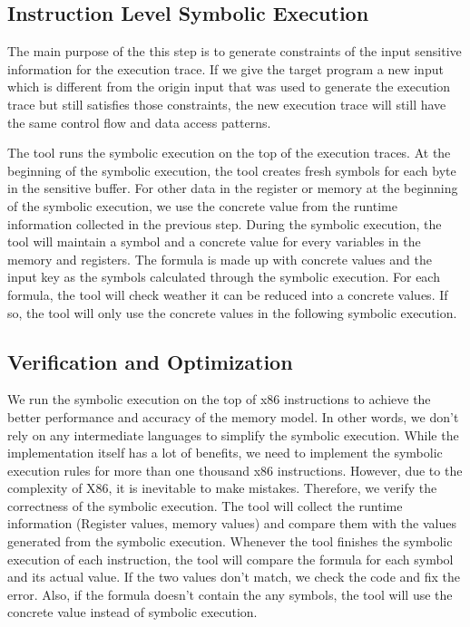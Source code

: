 \subsection{Instruction Level Symbolic Execution}
The main purpose of the this step is to generate constraints of the input sensitive information for the execution trace. If we give the target program a new input which is different from the origin input that was used to generate the execution trace but still satisfies those constraints, the new execution trace will still have the same control flow and data access patterns. 

The tool runs the symbolic execution on the top of the execution traces. At the beginning of the symbolic execution, the tool creates fresh symbols for each byte in the sensitive buffer. For other data in the register or memory at the beginning of the symbolic execution, we use the concrete value from the runtime information collected in the previous step. During the symbolic execution, the tool will maintain a symbol and a concrete value for every variables in the memory and registers. The formula is made up with concrete values and the input key as the symbols calculated through the symbolic execution. For each formula, the tool will check weather it can be reduced into a concrete values. If so, the tool will only use the concrete values in the following symbolic execution.

\subsection{Verification and Optimization}
We run the symbolic execution on the top of x86 instructions to achieve the better performance and accuracy of the memory model. In other words, we don’t rely on any intermediate languages to simplify the symbolic execution. While the implementation itself has a lot of benefits, we need to implement the symbolic execution rules for more than one thousand x86 instructions. However, due to the complexity of X86, it is inevitable to make mistakes. Therefore, we verify the correctness of the symbolic execution. The tool will collect the runtime information (Register values, memory values) and compare them with the values generated from the symbolic execution. Whenever the tool finishes the symbolic execution of each instruction, the tool will compare the formula for each symbol and its actual value. If the two values don’t match, we check the code and fix the error. Also, if the formula doesn’t contain the any symbols, the tool will use the concrete value instead of symbolic execution.

